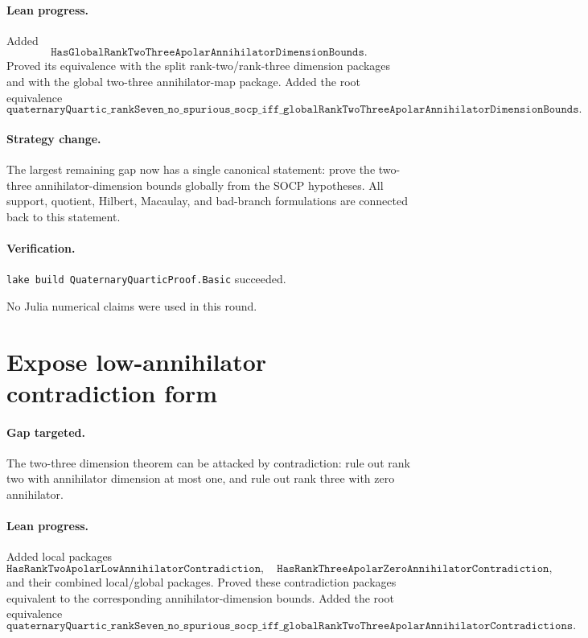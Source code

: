 \documentclass[11pt]{article}
\begin{document}
\paragraph{Lean progress.}
Added
\[
\texttt{HasGlobalRankTwoThreeApolarAnnihilatorDimensionBounds}.
\]
Proved its equivalence with the split rank-two/rank-three dimension packages
and with the global two-three annihilator-map package.  Added the root
equivalence
\[
\texttt{quaternaryQuartic\_rankSeven\_no\_spurious\_socp\_iff\_globalRankTwoThreeApolarAnnihilatorDimensionBounds}.
\]

\paragraph{Strategy change.}
The largest remaining gap now has a single canonical statement: prove the
two-three annihilator-dimension bounds globally from the SOCP hypotheses.  All
support, quotient, Hilbert, Macaulay, and bad-branch formulations are connected
back to this statement.

\paragraph{Verification.}
\texttt{lake build QuaternaryQuarticProof.Basic} succeeded.

No Julia numerical claims were used in this round.

\section*{Expose low-annihilator contradiction form}

\paragraph{Gap targeted.}
The two-three dimension theorem can be attacked by contradiction: rule out
rank two with annihilator dimension at most one, and rule out rank three with
zero annihilator.

\paragraph{Lean progress.}
Added local packages
\[
\texttt{HasRankTwoApolarLowAnnihilatorContradiction},
\quad
\texttt{HasRankThreeApolarZeroAnnihilatorContradiction},
\]
and their combined local/global packages.  Proved these contradiction packages
equivalent to the corresponding annihilator-dimension bounds.  Added the root
equivalence
\[
\texttt{quaternaryQuartic\_rankSeven\_no\_spurious\_socp\_iff\_globalRankTwoThreeApolarAnnihilatorContradictions}.
\]
\end{document}
